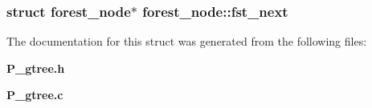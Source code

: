 \subsubsection{\setlength{\rightskip}{0pt plus 5cm}struct forest\_\-node$\ast$ forest\_\-node::fst\_\-next}\label{structforest__node_m1}




The documentation for this struct was generated from the following files:\begin{CompactItemize}
\item 
{\bf P\_\-gtree.h}\item 
{\bf P\_\-gtree.c}\end{CompactItemize}
